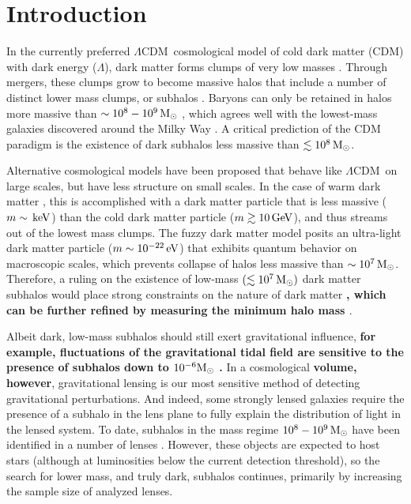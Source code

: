 \documentclass[twocolumn]{aastex62}
\newcommand{\acronym}[1]{{\small{#1}}}
\newcommand{\lcdm}{\acronym{$\Lambda$CDM}}
\newcommand{\changes}[1]{{\textbf{#1}}}
\begin{document}

\section{Introduction}
\label{sec:intro}
In the currently preferred \lcdm\ cosmological model of cold dark matter (CDM) with dark energy ($\Lambda$), dark matter forms clumps of very low masses \citep[e.g.,][]{springel2008}.
Through mergers, these clumps grow to become massive halos that include a number of distinct lower mass clumps, or subhalos \citep[e.g.,][]{whiterees1978}.
Baryons can only be retained in halos more massive than $\sim10^8-10^9\,\rm M_\odot$ \citep[e.g.,][]{efstathiou1992, bullock2000}, which agrees well with the lowest-mass galaxies discovered around the Milky Way \citep[e.g.,][]{sg2007, martin2008}.
A critical prediction of the CDM paradigm is the existence of dark subhalos less massive than $\lesssim10^8\,\rm M_\odot$.

Alternative cosmological models have been proposed that behave like \lcdm\ on large scales, but have less structure on small scales.
In the case of warm dark matter \citep[e.g.,][]{bode2001}, this is accomplished with a dark matter particle that is less massive ($m\sim\rm\, keV$) than the cold dark matter particle ($m\gtrsim10\rm\, GeV$), and thus streams out of the lowest mass clumps.
The fuzzy dark matter model \citep[e.g.,][]{hu2000} posits an ultra-light dark matter particle ($m\sim10^{-22}\rm\, eV$) that exhibits quantum behavior on macroscopic scales, which prevents collapse of halos less massive than $\sim10^7\,\rm M_\odot$.
Therefore, a ruling on the existence of low-mass \changes{$(\lesssim10^7\,\rm M_\odot)$} dark matter subhalos would place strong constraints on the nature of dark matter \citep[e.g.,][]{bullockmbk2017, buckleypeter2017}\changes{, which can be further refined by measuring the minimum halo mass \citep[e.g.,][]{schmid1999, hofmann2001, loebzaldarriaga2005}}.

Albeit dark, low-mass subhalos should still exert gravitational influence, \changes{for example, fluctuations of the gravitational tidal field are sensitive to the presence of subhalos down to $10^{-6}\rm M_\odot$ \citep{penarrubia2018}.}
In a cosmological \changes{volume, however}, gravitational lensing is our most sensitive method of detecting gravitational perturbations.
And indeed, some strongly lensed galaxies require the presence of a subhalo in the lens plane to fully explain the distribution of light in the lensed system.
To date, subhalos in the mass regime $10^8-10^9\,\rm M_\odot$ have been identified in a number of lenses \citep[e.g.,][]{vegetti2012,hezaveh2016}.
However, these objects are expected to host stars (although at luminosities below the current detection threshold), so the search for lower mass, and truly dark, subhalos continues, primarily by increasing the sample size of analyzed lenses.
\end{document}
